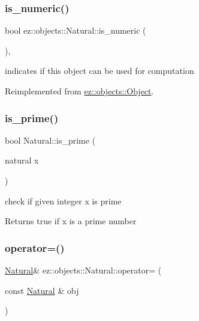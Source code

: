 \subsubsection{\texorpdfstring{is\+\_\+numeric()}{is\_numeric()}}
{\footnotesize\ttfamily bool ez\+::objects\+::\+Natural\+::is\+\_\+numeric (\begin{DoxyParamCaption}{ }\end{DoxyParamCaption})\hspace{0.3cm}{\ttfamily [inline]}, {\ttfamily [virtual]}}

indicates if this object can be used for computation 

Reimplemented from \hyperlink{classez_1_1objects_1_1Object_a19ba1672d4063232c4619e016ca178f8}{ez\+::objects\+::\+Object}.

\mbox{\label{classez_1_1objects_1_1Natural_a95e1896656977c50d213b85f4d070abf}} 
\subsubsection{\texorpdfstring{is\+\_\+prime()}{is\_prime()}}
{\footnotesize\ttfamily bool Natural\+::is\+\_\+prime (\begin{DoxyParamCaption}\item[{natural}]{x }\end{DoxyParamCaption})\hspace{0.3cm}{\ttfamily [static]}}

check if given integer x is prime \begin{DoxyReturn}{Returns}
true if x is a prime number 
\end{DoxyReturn}
\mbox{\label{classez_1_1objects_1_1Natural_a271019dcdff99e4826b564759f16d3f2}} 
\subsubsection{\texorpdfstring{operator=()}{operator=()}}
{\footnotesize\ttfamily \hyperlink{classez_1_1objects_1_1Natural}{Natural}\& ez\+::objects\+::\+Natural\+::operator= (\begin{DoxyParamCaption}\item[{const \hyperlink{classez_1_1objects_1_1Natural}{Natural} \&}]{obj }\end{DoxyParamCaption})\hspace{0.3cm}{\ttfamily [inline]}}

